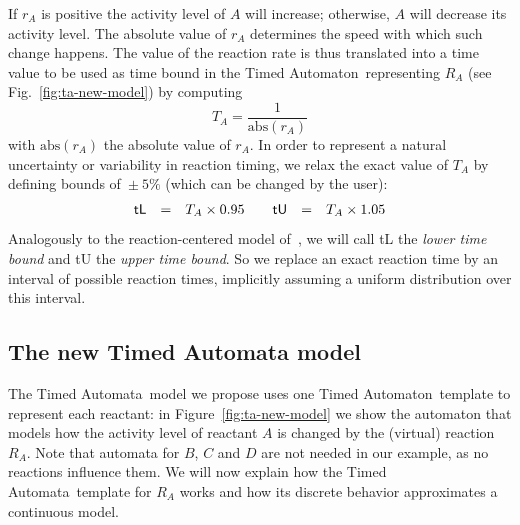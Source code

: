 \documentclass{llncs}
\newcommand{\ta}{Timed Automaton}
\newcommand{\tas}{Timed Automata}
\begin{document}
If $r_A$ is positive the activity level of $A$ will increase;
otherwise, $A$ will decrease its activity level.
The absolute value of $r_A$ determines the speed with which such change happens.
The value of the reaction rate is thus translated into a time value to be used as
time bound in the \ta\ representing $R_A$ (see Fig.~\ref{fig:ta-new-model}) by computing
$$T_A = \frac{1}{\mbox{abs}(r_A)}$$
with $\mbox{abs}(r_A)$ the absolute value of $r_A$. In order to represent
a natural uncertainty or variability in reaction timing, we relax the exact value of $T_A$ by
defining bounds of~$\pm~5\%$ (which can be changed by the user):
$$
\begin{array}{lcllcl}
  \mbox{\sf tL} &=& T_A \times 0.95 \qquad
  \mbox{\sf tU} &=& T_A \times 1.05
\end{array}
$$
Analogously to the reaction-centered model of~\cite{animo-ieee},
we will call {\sf tL} the \emph{lower time bound} and {\sf tU} the \emph{upper time bound}.
So we replace an exact reaction time by an interval of possible reaction times,
implicitly assuming a uniform distribution over this interval.



\subsection{The new Timed Automata model}\label{sec:ta-model}
The \tas\ model we propose uses one \ta\ template to represent each reactant:
in Figure~\ref{fig:ta-new-model} we show the automaton that models how the
activity level of reactant $A$ is changed by the (virtual) reaction $R_A$.
Note that automata for $B$, $C$ and $D$ are not needed in our example, as no reactions influence them.
We will now explain how the \tas\ template for $R_A$ works and how its discrete behavior approximates
a continuous model.
\end{document}
